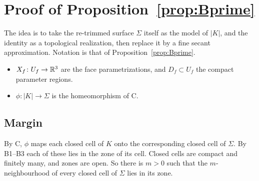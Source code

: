 \section{Proof of Proposition~\ref{prop:Bprime}}\label{sec:proofBprime}

The idea is to take the re-trimmed surface $\Sigma$ itself as the model of $|K|$, and the identity as a topological
realization, then replace it by a fine secant approximation. Notation is that of Proposition~\ref{prop:Bprime}.
\begin{itemize}
\item $X_f\colon U_f\to\mathbb{R}^3$ are the face parametrizations, and $D_f\subset U_f$ the compact parameter regions.
\item $\phi\colon|K|\to\Sigma$ is the homeomorphism of C.
\end{itemize}

\subsection{Margin}
By C, $\phi$ maps each closed cell of $K$ onto the corresponding closed cell of $\Sigma$. By B1--B3 each of these lies in
the zone of its cell. Closed cells are compact and finitely many, and zones are open. So there is $m>0$ such that the
$m$-neighbourhood of every closed cell of $\Sigma$ lies in its zone.

